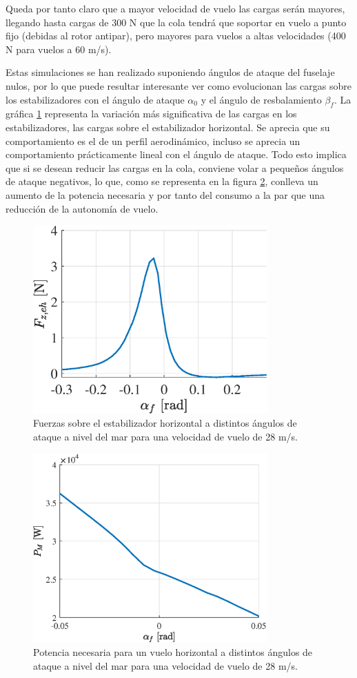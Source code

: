 Queda por tanto claro que a mayor velocidad de vuelo las cargas serán mayores, llegando hasta cargas de 300 N que la cola tendrá que soportar en vuelo a punto fijo (debidas al rotor antipar), pero mayores para vuelos a altas velocidades (400 N para vuelos a 60 m/s).


Estas simulaciones se han realizado suponiendo ángulos de ataque del fuselaje nulos, por lo que puede resultar interesante ver como evolucionan las cargas sobre los estabilizadores con el ángulo de ataque $\alpha_0$ y el ángulo de resbalamiento $\beta_f$. La gráfica \ref{FEa} representa la variación más significativa de las cargas en los estabilizadores, las cargas sobre el estabilizador horizontal. Se aprecia que su comportamiento es el de un perfil aerodinámico, incluso se aprecia un comportamiento prácticamente lineal con el ángulo de ataque. Todo esto implica que si se desean reducir las cargas en la cola, conviene volar a pequeños ángulos de ataque negativos, lo que, como se representa en la figura \ref{PMVHa}, conlleva un aumento de la potencia necesaria y por tanto del consumo a la par que una reducción de la autonomía de vuelo.

\begin{figure}
	\centering
	\includegraphics[width=90mm]{graficos/FEHa}
	\caption{Fuerzas sobre el estabilizador horizontal a distintos ángulos de ataque a nivel del mar para una velocidad de vuelo de 28 m/s.}
	\label{FEa}
\end{figure}

\begin{figure}
	\centering
	\includegraphics[width=90mm]{graficos/PMVHa}
	\caption{Potencia necesaria para un vuelo horizontal a distintos ángulos de ataque a nivel del mar para una velocidad de vuelo de 28 m/s.}
	\label{PMVHa}
\end{figure}

